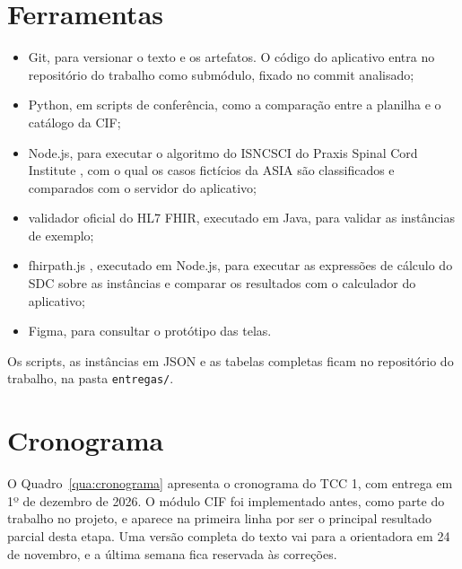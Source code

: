 \section{Ferramentas}
\label{sec:ferramentas}

\begin{itemize}
	\item Git, para versionar o texto e os artefatos. O código do aplicativo entra no repositório do trabalho como
	submódulo, fixado no commit analisado;
	\item Python, em scripts de conferência, como a comparação entre a planilha e o catálogo da CIF;
	\item Node.js, para executar o algoritmo do ISNCSCI do Praxis Spinal Cord Institute \cite{praxis2023isncsci}, com o
	qual os casos fictícios da ASIA são classificados e comparados com o servidor do aplicativo;
	\item validador oficial do HL7 FHIR, executado em Java, para validar as instâncias de exemplo;
	\item fhirpath.js \cite{hl7fhirpathjs}, executado em Node.js, para executar as expressões de cálculo do SDC sobre as
	instâncias e comparar os resultados com o calculador do aplicativo;
	\item Figma, para consultar o protótipo das telas.
\end{itemize}

Os scripts, as instâncias em JSON e as tabelas completas ficam no repositório do trabalho, na pasta
\texttt{entregas/}.

\section{Cronograma}
\label{sec:cronograma}

O Quadro~\ref{qua:cronograma} apresenta o cronograma do TCC 1, com entrega em 1º de dezembro de 2026. O módulo CIF
foi implementado antes, como parte do trabalho no projeto, e aparece na primeira linha por ser o principal resultado
parcial desta etapa. Uma versão completa do texto vai para a orientadora em 24 de novembro, e a última semana fica
reservada às correções.

